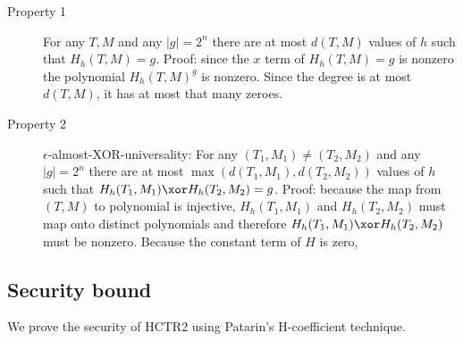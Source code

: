 \documentclass[letterpaper,11pt]{article}
\begin{document}
\begin{description}
    \item[Property 1]
    For any \(T, M\) and any \(|g| = 2^n\)
    there are at most \(d(T, M)\)
    values of \(h\) such that \(H_h(T, M) = g\).
    Proof: since the \(x\) term of \(H_h(T, M) = g\) is nonzero
    the polynomial \(H_h(T, M)^ g\) is nonzero.
    Since the degree is at most \(d(T, M)\), it has
    at most that many zeroes.
    \item[Property 2] 
    \(\epsilon\)-almost-XOR-universality: 
    For any \((T_1, M_1) \neq (T_2, M_2)\) and any \(|g| = 2^n\)
    there are at most \(\max(d(T_1, M_1), d(T_2, M_2))\)
    values of \(h\) such that \(H_h(T_1, M_1) \xor H_h(T_2, M_2) = g\).
    Proof: because the map from \((T, M)\) to polynomial is injective,
    \(H_h(T_1, M_1)\) and \(H_h(T_2, M_2)\) must map onto distinct
    polynomials and therefore \(H_h(T_1, M_1) \xor H_h(T_2, M_2)\)
    must be nonzero. Because the constant term of \(H\) is zero, 

\end{description}

\subsection{Security bound}

We prove the security of HCTR2 using Patarin's H-coefficient technique. 

\printbibliography[heading=bibintoc]
\end{document}

